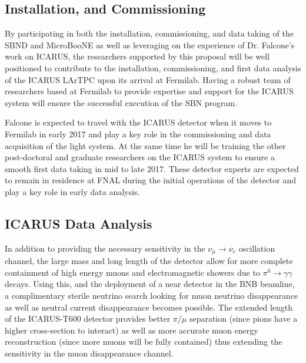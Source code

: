 \subsection{Installation, and Commissioning}\label{sec:ICARUSBulid}
By participating in both the installation, commissioning, and data taking of the SBND and MicroBooNE as well as leveraging on the experience of Dr. Falcone's work on ICARUS, the researchers supported by this proposal will be well positioned to contribute to the installation, commissioning, and first data analysis of the ICARUS LArTPC upon its arrival at Fermilab. Having a robust team of researchers based at Fermilab to provide expertise and support for the ICARUS system will ensure the successful execution of the SBN program.

Falcone is expected to travel with the ICARUS detector when it moves to Fermilab in early 2017 and play a key role in the commissioning and data acquisition of the light system. At the same time he will be training the other post-doctoral and graduate researchers on the ICARUS system to ensure a smooth first data taking in mid to late 2017. These detector experts are expected to remain in residence at FNAL during the initial operations of the detector and play a key role in early data analysis.

\subsection{ICARUS Data Analysis}\label{sec:ICARUSDataAnalysis}
In addition to providing the necessary sensitivity in the $\nu_{\mu} \rightarrow \nu_{e}$ oscillation channel, the large mass and long length of the detector allow for more complete containment of high energy muons and electromagnetic showers due to $\pi^{0} \rightarrow \gamma \gamma$ decays. Using this, and the deployment of a near detector in the BNB beamline, a complimentary sterile neutrino search looking for muon neutrino disappearance as well as neutral current disappearance becomes possible. The extended length of the ICARUS-T600 detector provides better $\pi / \mu$ separation (since pions have a higher cross-section to interact) as well as more accurate muon energy reconstruction (since more muons will be fully contained) thus extending the sensitivity in the muon disappearance channel. 

